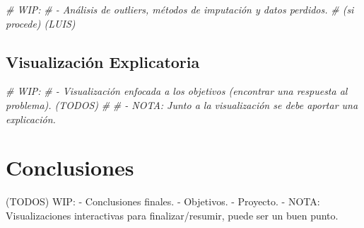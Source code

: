\documentclass[,,,,pdftex]{Definitions/mdpi}
\newenvironment{Shaded}{\begin{snugshade}}{\end{snugshade}}
\newcommand{\CommentTok}[1]{\textcolor[rgb]{0.56,0.35,0.01}{\textit{#1}}}
\begin{document}
\begin{Shaded}
\begin{Highlighting}[]
\CommentTok{\# WIP:}
\CommentTok{\#   {-} Análisis de outliers, métodos de imputación y datos perdidos.}
\CommentTok{\# (si procede) (LUIS)}
\end{Highlighting}
\end{Shaded}

\subsection{Visualización
Explicatoria}\label{visualizaciuxf3n-explicatoria}

\begin{Shaded}
\begin{Highlighting}[]
\CommentTok{\# WIP:}
\CommentTok{\#   {-} Visualización enfocada a los objetivos (encontrar una respuesta al problema). (TODOS)}
\CommentTok{\#}
\CommentTok{\# {-} NOTA: Junto a la visualización se debe aportar una explicación.}
\end{Highlighting}
\end{Shaded}

\section{Conclusiones}\label{conclusiones}

(TODOS) WIP: - Conclusiones finales. - Objetivos. - Proyecto. - NOTA:
Visualizaciones interactivas para finalizar/resumir, puede ser un buen
punto.


\vspace{6pt}










\end{document}
